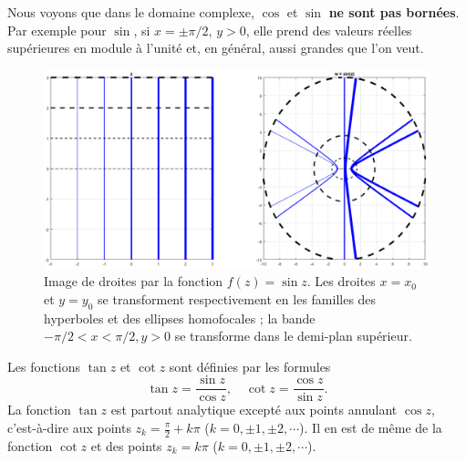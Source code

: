 
Nous voyons que dans le domaine complexe, $\cos$ et $\sin $ \textbf{ne sont pas bornées}. Par exemple pour $\sin$, si $x=\pm \pi/2$, $y>0$, elle prend  des valeurs réelles supérieures en module à l'unité et, en général, aussi grandes que l'on veut.

\begin{figure}[hbt]
\begin{center}\includegraphics[scale=0.46]{images/complexsin3.png}
\end{center}
\caption{\small Image de droites par la fonction $f(z)=\sin z$. Les droites $x=x_0$ et $y=y_0$ se transforment respectivement en les familles des hyperboles et des ellipses homofocales ; la bande $-\pi/2 < x<\pi/2, y>0$ se transforme dans le demi-plan supérieur.}\label{fig:sin}
\end{figure}

Les fonctions $\tan z$ et $\cot z$ sont définies par les formules
\[\tan z= \frac{\sin z}{\cos z}, \quad \cot z =  \frac{\cos z}{\sin z}.\]
La fonction $\tan z$ est partout analytique excepté aux points annulant $\cos z$, c'est-à-dire aux points $z_k=\frac{\pi}{2} + k\pi$ ($k=0, \pm 1, \pm 2, \cdots$). Il en est de même de la fonction $\cot z$ et des points $z_k= k\pi$ ($k=0, \pm 1, \pm 2, \cdots$).

